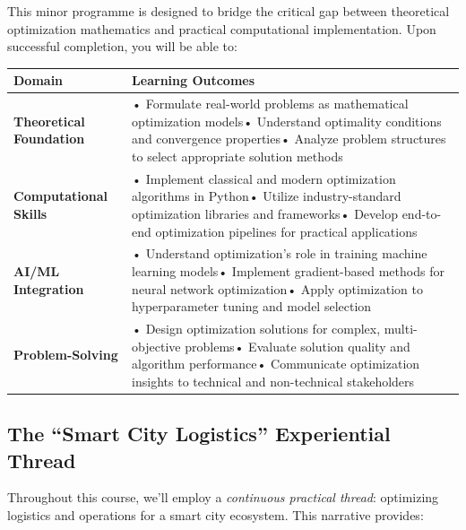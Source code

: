\documentclass[
  letterpaper,
  DIV=11,
  numbers=noendperiod]{scrreprt}
\begin{document}
This minor programme is designed to bridge the critical gap between
theoretical optimization mathematics and practical computational
implementation. Upon successful completion, you will be able to:

\begin{longtable}[]{@{}
  >{\raggedright\arraybackslash}p{}
  >{\raggedright\arraybackslash}p{}@{}}
\toprule\noalign{}
\begin{minipage}[b]{\linewidth}\raggedright
\textbf{Domain}
\end{minipage} & \begin{minipage}[b]{\linewidth}\raggedright
\textbf{Learning Outcomes}
\end{minipage} \\
\midrule\noalign{}
\endhead
\bottomrule\noalign{}
\endlastfoot
\textbf{Theoretical Foundation} & • Formulate real-world problems as
mathematical optimization models• Understand optimality conditions and
convergence properties• Analyze problem structures to select appropriate
solution methods \\
\textbf{Computational Skills} & • Implement classical and modern
optimization algorithms in Python• Utilize industry-standard
optimization libraries and frameworks• Develop end-to-end optimization
pipelines for practical applications \\
\textbf{AI/ML Integration} & • Understand optimization's role in
training machine learning models• Implement gradient-based methods for
neural network optimization• Apply optimization to hyperparameter tuning
and model selection \\
\textbf{Problem-Solving} & • Design optimization solutions for complex,
multi-objective problems• Evaluate solution quality and algorithm
performance• Communicate optimization insights to technical and
non-technical stakeholders \\
\end{longtable}

\subsection{The ``Smart City Logistics'' Experiential
Thread}\label{the-smart-city-logistics-experiential-thread}

Throughout this course, we'll employ a \emph{continuous practical
thread}: optimizing logistics and operations for a smart city ecosystem.
This narrative provides:
\end{document}
